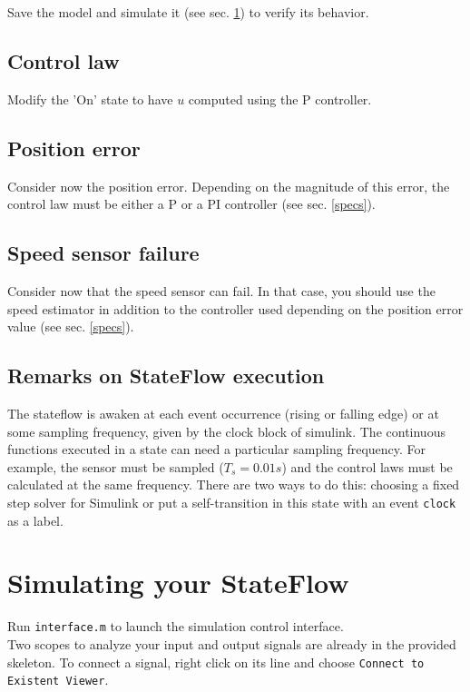 \documentclass[a4paper]{article}
\begin{document}
Save the model and simulate it (see sec. \ref{simu}) to verify its behavior.

\subsection{Control law}
Modify the 'On' state to have $u$ computed using the P controller.

\subsection{Position error}
Consider now the position error. Depending on the magnitude of this error, the control law must
be either a P or a PI controller (see sec. \ref{specs}).

\subsection{Speed sensor failure}
Consider now that the speed sensor can fail. In that case, you should use the speed estimator
in addition to the controller used depending on the position error value (see sec. \ref{specs}).

\subsection{Remarks on StateFlow execution}

The stateflow is awaken at each event occurrence (rising or falling edge) or at some sampling 
frequency, given by the clock block of simulink. The continuous functions executed in a state can 
need a particular sampling frequency. For example, the sensor must be sampled ($T_s=0.01s$) and the 
control laws must be calculated at the same frequency. There are two ways to do this: choosing a 
fixed step solver for Simulink or put a self-transition in this state with an event \texttt{clock} 
as a label.

\section{Simulating your StateFlow}
\label{simu}

Run {\tt interface.m} to launch the simulation control interface.\\

Two scopes to analyze your input and output signals are already in the provided skeleton.
To connect a signal, right click on its line and choose {\tt Connect to Existent Viewer}.
\end{document}
